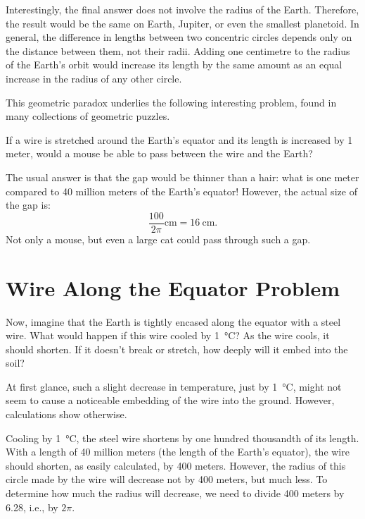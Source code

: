 Interestingly, the final answer does not involve the radius of the Earth. Therefore, the result would be the same on Earth, Jupiter, or even the smallest planetoid. In general, the difference in lengths between two concentric circles depends only on the distance between them, not their radii. Adding one centimetre to the radius of the Earth's orbit would increase its length by the same amount as an equal increase in the radius of any other circle.

This geometric paradox underlies the following interesting problem, found in many collections of geometric puzzles.

If a wire is stretched around the Earth's equator and its length is increased by 1 meter, would a mouse be able to pass between the wire and the Earth?

The usual answer is that the gap would be thinner than a hair: what is one meter compared to 40 million meters of the Earth's equator! However, the actual size of the gap is:
\begin{equation*}%
\frac{100}{2 \pi} \si{\centi\meter} = \SI{16}{\centi\meter}.
\end{equation*}
Not only a mouse, but even a large cat could pass through such a gap.


\section{Wire Along the Equator Problem}
\label{sec-9.9}


\ques Now, imagine that the Earth is tightly encased along the equator with a steel wire. What would happen if this wire cooled by \SI{1}{\degreeCelsius}? As the wire cools, it should shorten. If it doesn't break or stretch, how deeply will it embed into the soil?



\ans At first glance, such a slight decrease in temperature, just by \SI{1}{\degreeCelsius}, might not seem to cause a noticeable embedding of the wire into the ground. However, calculations show otherwise.

Cooling by \SI{1}{\degreeCelsius}, the steel wire shortens by one hundred thousandth of its length. With a length of 40 million meters (the length of the Earth's equator), the wire should shorten, as easily calculated, by 400 meters. However, the radius of this circle made by the wire will decrease not by 400 meters, but much less. To determine how much the radius will decrease, we need to divide 400 meters by 6.28, i.e., by $2\pi$.

